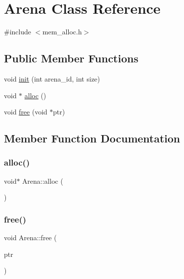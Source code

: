\hypertarget{classArena}{}\section{Arena Class Reference}
\label{classArena}


{\ttfamily \#include $<$mem\+\_\+alloc.\+h$>$}

\subsection*{Public Member Functions}
\begin{DoxyCompactItemize}
\item 
void \hyperlink{classArena_ae036f0b8b6a694823caebe6a10755147}{init} (int arena\+\_\+id, int size)
\item 
void $\ast$ \hyperlink{classArena_aa81faa6866e6be3778ce0d7a9bad1feb}{alloc} ()
\item 
void \hyperlink{classArena_ae9d9d96d4cf1381cb3d87526c11583b4}{free} (void $\ast$ptr)
\end{DoxyCompactItemize}


\subsection{Member Function Documentation}
\mbox{\label{classArena_aa81faa6866e6be3778ce0d7a9bad1feb}} 
\subsubsection{\texorpdfstring{alloc()}{alloc()}}
{\footnotesize\ttfamily void$\ast$ Arena\+::alloc (\begin{DoxyParamCaption}{ }\end{DoxyParamCaption})}

\mbox{\label{classArena_ae9d9d96d4cf1381cb3d87526c11583b4}} 
\subsubsection{\texorpdfstring{free()}{free()}}
{\footnotesize\ttfamily void Arena\+::free (\begin{DoxyParamCaption}\item[{void $\ast$}]{ptr }\end{DoxyParamCaption})}

